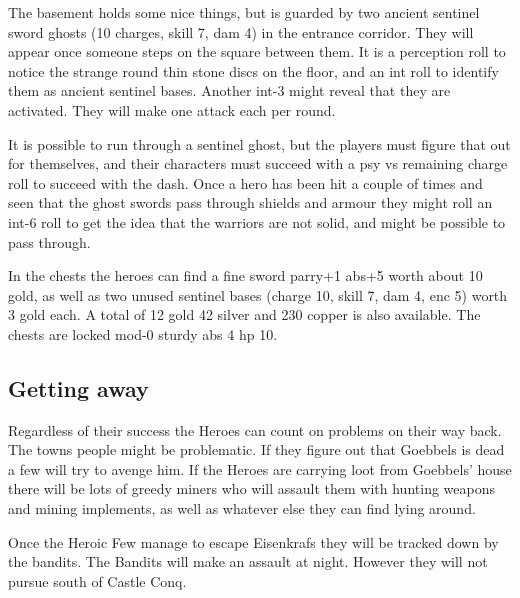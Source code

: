 The basement holds some nice things, but is guarded by two ancient sentinel sword ghosts (10 charges, skill 7, dam 4) in the entrance corridor. They will appear once someone steps on the square between them.
It is a perception roll to notice the strange round thin stone discs on the floor, and an int roll to identify them as ancient sentinel bases. Another int-3 might reveal that they are activated. They will make one attack each per round.

It is possible to run through a sentinel ghost, but the players must figure that out for themselves, and their characters must succeed with a psy vs remaining charge roll to succeed with the dash. Once a hero has been hit a couple of times and seen that the ghost swords pass through shields and armour they might roll an int-6 roll to get the idea that the warriors are not solid, and might be possible to pass through.

In the chests the heroes can find a fine sword parry+1 abs+5 worth about 10 gold, as well as two unused sentinel bases (charge 10, skill 7, dam 4, enc 5) worth 3 gold each. A total of 12 gold 42 silver and 230 copper is also available. The chests are locked mod-0 sturdy abs 4 hp 10.


%

%

\subsection*{Getting away}
Regardless of their success the Heroes can count on problems on their way back. The towns people might be problematic. If they figure out that Goebbels is dead a few will try to avenge him. If the Heroes are carrying loot from Goebbels' house there will be lots of greedy miners who will assault them with hunting weapons and mining implements, as well as whatever else they can find lying around.

Once the Heroic Few manage to escape Eisenkrafs they will be tracked down by the bandits. The Bandits will make an assault at night. However they will not pursue south of Castle Conq.


